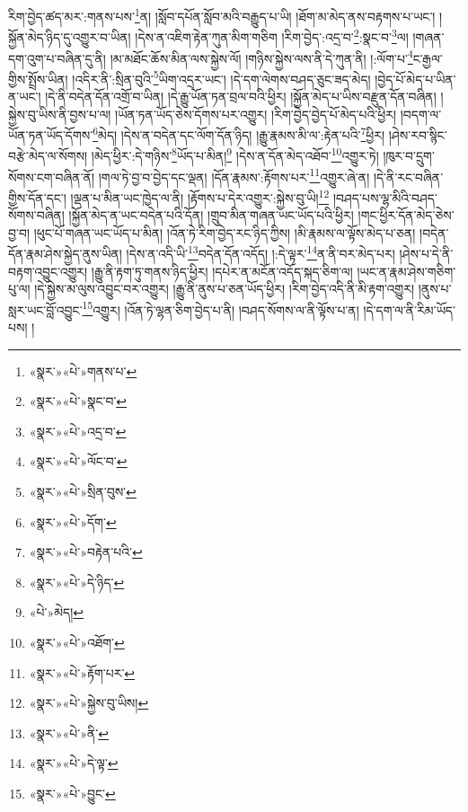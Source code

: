 རིག་བྱེད་ཚད་མར་:གནས་པས་\footnote{«སྣར་»«པེ་»གནས་པ་}ན། །སློབ་དཔོན་སློབ་མའི་བརྒྱུད་པ་ཡི། །ཐོག་མ་མེད་ནས་བརྟགས་པ་ཡང་། །སྐྱོན་མེད་ཉིད་དུ་འགྱུར་བ་ཡིན། །དེས་ན་འཇིག་རྟེན་ཀུན་མིག་གཅིག །རིག་བྱེད་:འདྲ་བ་\footnote{«སྣར་»«པེ་»སྣང་བ་}:སྣང་བ་\footnote{«སྣར་»«པེ་»འདྲ་བ་}ལ། །གཞན་དག་འུག་པ་བཞིན་དུ་ནི། །མ་མཐོང་ཆོས་མིན་ལས་སྐྱེས་ལོ། །གཉིས་སྐྱེས་ལས་ནི་དེ་ཀུན་ནི། །:ལོག་པ་\footnote{«སྣར་»«པེ་»ལོང་བ་}ང་རྒྱལ་གྱིས་སྤྲོས་ཡིན། །འདིར་ནི་:སྲིན་བུའི་\footnote{«སྣར་»«པེ་»སྲིན་བུས་}ཡིག་འདྲར་ཡང་། །དེ་དག་ལེགས་བཤད་ཅུང་ཟད་མེད། །བྱེད་པོ་མེད་པ་ཡིན་ན་ཡང་། །དེ་ནི་བདེན་དོན་འགྲོ་བ་ཡིན། །དེ་རྒྱུ་ཡོན་ཏན་བྲལ་བའི་ཕྱིར། །སྐྱོན་མེད་པ་ཡིས་བརྫུན་དོན་བཞིན། །སྐྱེས་བུ་ཡིས་ནི་བྱས་པ་ལ། །ཡོན་ཏན་ཡོད་ཅེས་དོགས་པར་འགྱུར། །རིག་བྱེད་བྱེད་པོ་མེད་པའི་ཕྱིར། །བདག་ལ་ཡོན་ཏན་ཡོད་དོགས་\footnote{«སྣར་»«པེ་»དོག་}མེད། །དེས་ན་བདེན་དང་ལོག་དོན་ཉིད། །རྒྱུ་རྣམས་མི་ལ་:རྟེན་པའི་\footnote{«སྣར་»«པེ་»བརྟེན་པའི་}ཕྱིར། །ཤེས་རབ་སྙིང་བརྩེ་མེད་ལ་སོགས། །མེད་ཕྱིར་:དེ་གཉིས་\footnote{«སྣར་»«པེ་»དེ་ཉིད་}ཡོད་པ་མིན།\footnote{«པེ་»མེད།} །དེས་ན་དོན་མེད་འཐོབ་\footnote{«སྣར་»«པེ་»འཐོག་}འགྱུར་ཏེ། །ཁུར་བ་དྲུག་སོགས་ངག་བཞིན་ནོ། །གལ་ཏེ་བྱ་བ་བྱེད་དང་ལྡན། །དོན་རྣམས་:རྟོགས་པར་\footnote{«སྣར་»«པེ་»རྟོག་པར་}འགྱུར་ཞེ་ན། །དེ་ནི་རང་བཞིན་གྱིས་དོན་དང་། །ལྡན་པ་མིན་ཡང་ཁྱེད་ལ་ནི། །རྟོགས་པ་དེར་འགྱུར་:སྐྱེས་བུ་ཡི།\footnote{«སྣར་»«པེ་»སྐྱེས་བུ་ཡིས།} །བཤད་པས་ལྷ་མིའི་བཤད་སོགས་བཞིན། །སྐྱོན་མེད་ན་ཡང་བདེན་པའི་དོན། །གྲུབ་མིན་གཞན་ཡང་ཡོད་པའི་ཕྱིར། །གང་ཕྱིར་དོན་མེད་ཅེས་བྱ་བ། །ཕུང་པོ་གཞན་ཡང་ཡོད་པ་མིན། །འོན་ཏེ་རིག་བྱེད་རང་ཉིད་ཀྱིས། །མི་རྣམས་ལ་ལྟོས་མེད་པ་ཅན། །བདེན་དོན་རྣམ་ཤེས་སྐྱེད་ནུས་ཡིན། །དེས་ན་འདི་ཡི་\footnote{«སྣར་»«པེ་»ནི་}བདེན་དོན་འདོད། །:དེ་ལྟར་\footnote{«སྣར་»«པེ་»དེ་ལྟ་}ན་ནི་བར་མེད་པར། །ཤེས་པ་དེ་ནི་བརྟག་འབྱུང་འགྱུར། །རྒྱུ་ནི་རྟག་ཏུ་གནས་ཉིད་ཕྱིར། །དཔེར་ན་མངོན་འདོད་སྐད་ཅིག་ལ། །ཡང་ན་རྣམ་ཤེས་གཅིག་པུ་ལ། །དེ་སྐྱེས་མ་ལུས་འབྱུང་བར་འགྱུར། །རྒྱུ་ནི་ནུས་པ་ཅན་ཡོད་ཕྱིར། །རིག་བྱེད་འདི་ནི་མི་རྟག་འགྱུར། །ནུས་པ་སླར་ཡང་བློ་འབྱུང་\footnote{«སྣར་»«པེ་»བྱུང་}འགྱུར། །འོན་ཏེ་ལྷན་ཅིག་བྱེད་པ་ནི། །བཤད་སོགས་ལ་ནི་ལྟོས་པ་ན། །དེ་དག་ལ་ནི་རིམ་ཡོད་པས། །
